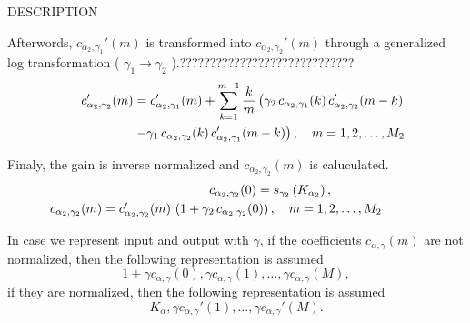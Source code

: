 \begin{qsection}{DESCRIPTION}
\par
Afterwords, $c_{\alpha_2,\gamma_1}'(m)$ is transformed into 
$c_{\alpha_2,\gamma_2}'(m)$ through a generalized log transformation
( $\gamma_1 \rightarrow \gamma_2$ ).?????????????????????????????
\begin{eqnarray*}
\hspace{-15mm}&&c_{\alpha_2,\gamma_2}'(m) =
        c_{\alpha_2,\gamma_1}'(m)+\sum_{k=1}^{m-1} \frac{k}{m}
          \left( \gamma_2\,c_{\alpha_2,\gamma_1}(k)\,
	  c_{\alpha_2,\gamma_2}'(m-k) \right. \nonumber \\
\hspace{-15mm}&& \hspace{30mm} \left. -\gamma_1\,c_{\alpha_2,\gamma_2}(k)\,
          c_{\alpha_2,\gamma_1}'(m-k) \right), 
	  \quad m = 1, 2, \ldots, M_2 
\end{eqnarray*}

\par
Finaly, the gain is inverse normalized and $c_{\alpha_2,\gamma_2}(m)$
is caluculated.
\begin{eqnarray*}
\hspace{-15mm}&&c_{\alpha_2,\gamma_2}(0)= 
	s_{\gamma_2}\left(K_{\alpha_2}\right), \qquad \qquad \\
\hspace{-15mm}&&c_{\alpha_2,\gamma_2}(m) =
          c_{\alpha_2,\gamma_2}'(m)\,\left(1+\gamma_2\, 
          c_{\alpha_2,\gamma_2}(0)\right), 
          \quad m = 1,2,\ldots, M_2
\end{eqnarray*}

In case we represent input and output with $\gamma$,
if the coefficients $c_{\alpha,\gamma}(m)$ are not normalized, then
the following representation is assumed
\begin{displaymath}
1+\gamma c_{\alpha,\gamma}(0), \gamma c_{\alpha,\gamma}(1), \ldots, \gamma c_{\alpha,\gamma}(M),
\end{displaymath}
if they are normalized, then
the following representation is assumed
\begin{displaymath}
K_\alpha,\gamma c_{\alpha,\gamma}'(1),\ldots, \gamma c_{\alpha,\gamma}'(M).
\end{displaymath}

\end{qsection}

\begin{options}
\end{options}


